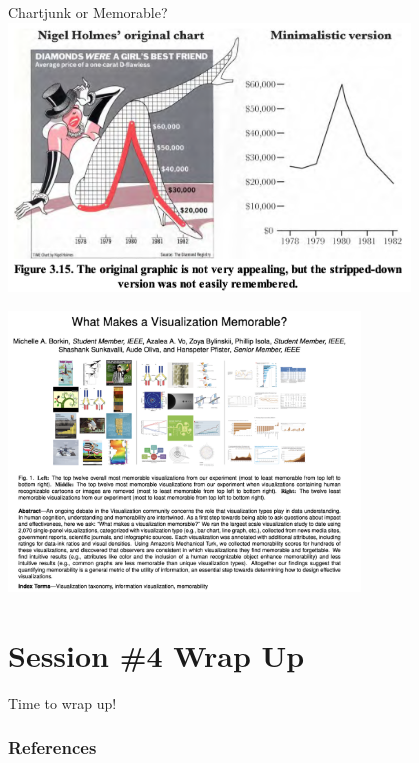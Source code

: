 \documentclass[notes, aspectratio=1610]{beamer}
\begin{document}
\begin{frame}{Chartjunk or Memorable?}{}
	\centering 
	\includegraphics[width=0.8\textwidth]{images/chartjunk_vs_tufter.png}
\end{frame}

\begin{frame}{}{}
	\centering
	\includegraphics[width=0.7\textwidth]{images/memorable_data_viz.png}
\end{frame}

\section{Session \#4 Wrap Up}

\begin{frame}{}{}
	\LARGE \centering Time to wrap up!
\end{frame}

\begin{frame}
	\frametitle{References}
	\printbibliography
 \end{frame} 
\end{document}
